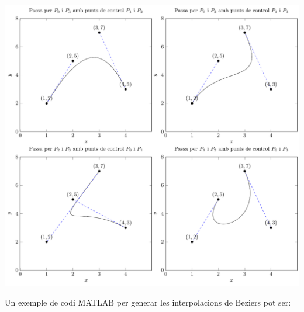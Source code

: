 \begin{llista}
\begin{llista}
\end{llista}

\begin{minipage}[t]{\linewidth}
  \vspace{-2ex}
  \includegraphics[width=\textwidth]{../figures/interpolaciobeziers.pdf}
  \label{fig:interpolaciobeziers}
\end{minipage}
Un exemple de codi MATLAB per generar les interpolacions de Beziers pot ser:


\end{llista}
